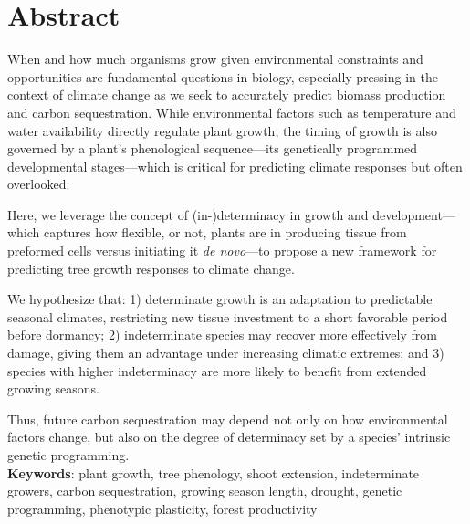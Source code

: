 \documentclass{article}
\begin{document}
	
	
\section*{Abstract} %
	When and how much organisms grow given environmental constraints and opportunities are fundamental questions in biology, especially pressing in the context of climate change as we seek to accurately predict biomass production and carbon sequestration. While environmental factors such as temperature and water availability directly regulate plant growth, the timing of growth is also governed by a plant’s phenological sequence—its genetically programmed developmental stages—which is critical for predicting climate responses but often overlooked.
	
	Here, we leverage the concept of (in-)determinacy in growth and development—which captures how flexible, or not, plants are in producing tissue from preformed cells versus initiating it \textit{de novo}—to propose a new framework for predicting tree growth responses to climate change.
	
	We hypothesize that: 1) determinate growth is an adaptation to predictable seasonal climates, restricting new tissue investment to a short favorable period before dormancy; 2) indeterminate species may recover more effectively from damage, giving them an advantage under increasing climatic extremes; and 3) species with higher indeterminacy are more likely to benefit from extended growing seasons.
	
	Thus, future carbon sequestration may depend not only on how environmental factors change, but also on the degree of determinacy set by a species’ intrinsic genetic programming.\\
		
			\textbf{Keywords}: plant growth, tree phenology, shoot extension, indeterminate growers, carbon sequestration, growing season length, drought, genetic programming, phenotypic plasticity, forest productivity
			\newpage
			
\end{document}
